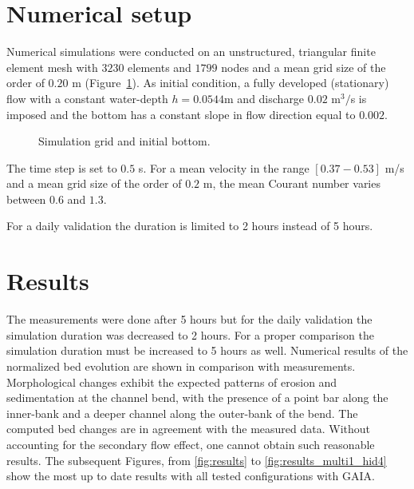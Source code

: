 %
%
\section{Numerical setup}
%
Numerical simulations were conducted on an unstructured, triangular finite element mesh with
$3230$ elements and $1799$ nodes and a mean grid size of the order of $0.20$ m (Figure~\ref{fig:mesh}).
As initial condition, a fully developed (stationary) flow with a constant water-depth $h = 0.0544$m and discharge $0.02$ m$^3/$s is imposed and the bottom has a constant slope in flow direction equal to $0.002$.

\begin{figure} [!h]
\centering
 \caption{Simulation grid and initial bottom.}\label{fig:mesh}
\end{figure}

The time step is set to $0.5$ s. For a mean velocity in the range $[0.37-0.53]$ m/s and
a mean grid size of the order of $0.2$ m, the mean Courant number varies between $0.6$ and $1.3$.

For a daily validation the duration is limited to 2 hours instead of 5 hours.

\section{Results}
%
The measurements were done after 5 hours but for the daily validation the simulation duration was decreased to 2 hours. For a proper comparison the simulation duration must be increased to 5 hours as well.
Numerical results of the normalized bed evolution are shown in
comparison with measurements.
Morphological changes exhibit the expected
patterns of erosion and sedimentation at the channel bend, with the presence of a point bar along the inner-bank and a deeper channel along the outer-bank of the bend.
The computed bed changes are in agreement with the measured data. Without accounting for the secondary flow effect, one cannot obtain such reasonable results.
The subsequent Figures, from \ref{fig:results} to \ref{fig:results_multi1_hid4} show the most up to date results with all tested configurations with GAIA.

